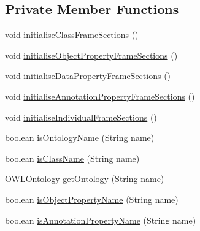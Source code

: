 \subsection*{Private Member Functions}
\begin{DoxyCompactItemize}
\item 
void \hyperlink{classorg_1_1coode_1_1owlapi_1_1manchesterowlsyntax_1_1_manchester_o_w_l_syntax_editor_parser_a56f74cc3609ec0654b321752c26a9f01}{initialise\-Class\-Frame\-Sections} ()
\item 
void \hyperlink{classorg_1_1coode_1_1owlapi_1_1manchesterowlsyntax_1_1_manchester_o_w_l_syntax_editor_parser_ac06959659b7faabd45e8b1ed11f0ff1c}{initialise\-Object\-Property\-Frame\-Sections} ()
\item 
void \hyperlink{classorg_1_1coode_1_1owlapi_1_1manchesterowlsyntax_1_1_manchester_o_w_l_syntax_editor_parser_a717dd4d26e25c7d7b490e4b845933727}{initialise\-Data\-Property\-Frame\-Sections} ()
\item 
void \hyperlink{classorg_1_1coode_1_1owlapi_1_1manchesterowlsyntax_1_1_manchester_o_w_l_syntax_editor_parser_a39e84554a1a791194e86ef0584178447}{initialise\-Annotation\-Property\-Frame\-Sections} ()
\item 
void \hyperlink{classorg_1_1coode_1_1owlapi_1_1manchesterowlsyntax_1_1_manchester_o_w_l_syntax_editor_parser_a69a62923cc137ff59bc1778a590413c2}{initialise\-Individual\-Frame\-Sections} ()
\item 
boolean \hyperlink{classorg_1_1coode_1_1owlapi_1_1manchesterowlsyntax_1_1_manchester_o_w_l_syntax_editor_parser_a828e79f4e05858429e399212a5067725}{is\-Ontology\-Name} (String name)
\item 
boolean \hyperlink{classorg_1_1coode_1_1owlapi_1_1manchesterowlsyntax_1_1_manchester_o_w_l_syntax_editor_parser_acfb9ec7aeca0d7ad7655af3f5df298c3}{is\-Class\-Name} (String name)
\item 
\hyperlink{interfaceorg_1_1semanticweb_1_1owlapi_1_1model_1_1_o_w_l_ontology}{O\-W\-L\-Ontology} \hyperlink{classorg_1_1coode_1_1owlapi_1_1manchesterowlsyntax_1_1_manchester_o_w_l_syntax_editor_parser_a3cf6d2b3135d4d64630de7da353f21d2}{get\-Ontology} (String name)
\item 
boolean \hyperlink{classorg_1_1coode_1_1owlapi_1_1manchesterowlsyntax_1_1_manchester_o_w_l_syntax_editor_parser_a7981e53b437565aeed1e291b705aaf42}{is\-Object\-Property\-Name} (String name)
\item 
boolean \hyperlink{classorg_1_1coode_1_1owlapi_1_1manchesterowlsyntax_1_1_manchester_o_w_l_syntax_editor_parser_a604edacce215b69bd03704f2270621c0}{is\-Annotation\-Property\-Name} (String name)

\end{DoxyCompactItemize}

